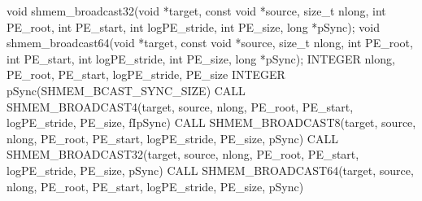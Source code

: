 \synC   %
 void shmem_broadcast32(void *target, const void *source, size_t nlong, int PE_root, int PE_start, int logPE_stride, int PE_size, long *pSync);
 void shmem_broadcast64(void *target, const void *source, size_t nlong, int PE_root, int PE_start, int logPE_stride, int PE_size, long *pSync);
\synF   %
 INTEGER nlong, PE_root, PE_start, logPE_stride, PE_size
 INTEGER pSync(SHMEM_BCAST_SYNC_SIZE)
 CALL SHMEM_BROADCAST4(target, source, nlong, PE_root, PE_start, logPE_stride, PE_size, fIpSync)
 CALL SHMEM_BROADCAST8(target, source, nlong, PE_root, PE_start, logPE_stride, PE_size, pSync)
 CALL SHMEM_BROADCAST32(target, source, nlong, PE_root, PE_start, logPE_stride, PE_size, pSync)
 CALL SHMEM_BROADCAST64(target, source, nlong, PE_root, PE_start, logPE_stride, PE_size, pSync)

